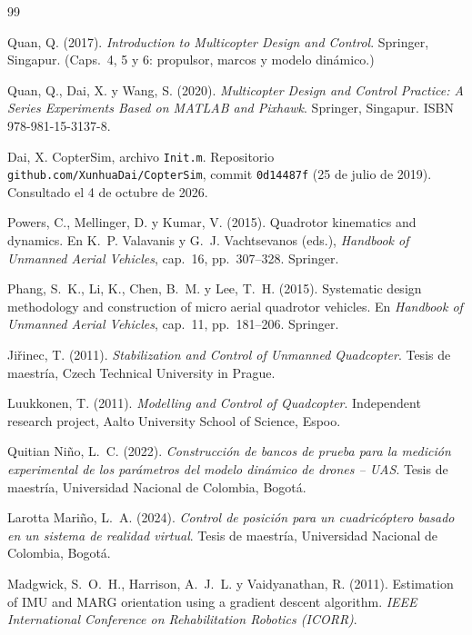 \clearpage
{}
{}
\begin{thebibliography}{99}
\small
\setlength{\itemsep}{0.25em}

 Quan, Q. (2017). \emph{Introduction to Multicopter Design and
Control}. Springer, Singapur. (Caps.~4, 5 y 6: propulsor, marcos y modelo
dinámico.)

 Quan, Q., Dai, X. y Wang, S. (2020). \emph{Multicopter Design
and Control Practice: A Series Experiments Based on MATLAB and Pixhawk}.
Springer, Singapur. ISBN 978-981-15-3137-8.

 Dai, X. CopterSim, archivo \texttt{Init.m}. Repositorio
\texttt{github.com/XunhuaDai/CopterSim}, commit \texttt{0d14487f} (25 de julio
de 2019). Consultado el 4 de octubre de 2026.

 Powers, C., Mellinger, D. y Kumar, V. (2015). Quadrotor
kinematics and dynamics. En K.~P. Valavanis y G.~J. Vachtsevanos (eds.),
\emph{Handbook of Unmanned Aerial Vehicles}, cap.~16, pp.~307--328. Springer.

 Phang, S.~K., Li, K., Chen, B.~M. y Lee, T.~H. (2015).
Systematic design methodology and construction of micro aerial quadrotor
vehicles. En \emph{Handbook of Unmanned Aerial Vehicles}, cap.~11,
pp.~181--206. Springer.

 Jiřinec, T. (2011). \emph{Stabilization and Control of
Unmanned Quadcopter}. Tesis de maestría, Czech Technical University in
Prague.

 Luukkonen, T. (2011). \emph{Modelling and Control of
Quadcopter}. Independent research project, Aalto University School of
Science, Espoo.

 Quitian Niño, L.~C. (2022). \emph{Construcción de bancos
de prueba para la medición experimental de los parámetros del modelo
dinámico de drones -- UAS}. Tesis de maestría, Universidad Nacional de
Colombia, Bogotá.

 Larotta Mariño, L.~A. (2024). \emph{Control de posición
para un cuadricóptero basado en un sistema de realidad virtual}. Tesis de
maestría, Universidad Nacional de Colombia, Bogotá.

 Madgwick, S.~O.~H., Harrison, A.~J.~L. y
Vaidyanathan, R. (2011). Estimation of IMU and MARG orientation using a
gradient descent algorithm. \emph{IEEE International Conference on
Rehabilitation Robotics (ICORR)}.


\end{thebibliography}
